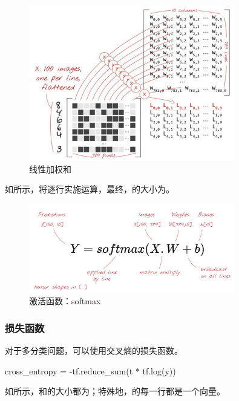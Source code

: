 \begin{content}
\begin{figure}[H]
\centering
\includegraphics[width=0.8\textwidth]{figures/mnist-linear-sum.png}
\caption{线性加权和}
 \label{fig:mnist-linear-sum}
\end{figure}

如所示，将逐行实施运算，最终，的大小为\code{[100, 10]}。

\begin{figure}[H]
\centering
\includegraphics[width=0.8\textwidth]{figures/mnist-softmax.png}
\caption{激活函数：softmax}
 \label{fig:mnist-softmax}
\end{figure}

\subsubsection{损失函数}

对于多分类问题，可以使用交叉熵的损失函数。

\begin{leftbar}
\begin{python}
cross_entropy = -tf.reduce_sum(t * tf.log(y))
\end{python}
\end{leftbar}

如所示，和的大小都为\code{[100, 10]}；特殊地，的每一行都是一个向量。


\end{content}
